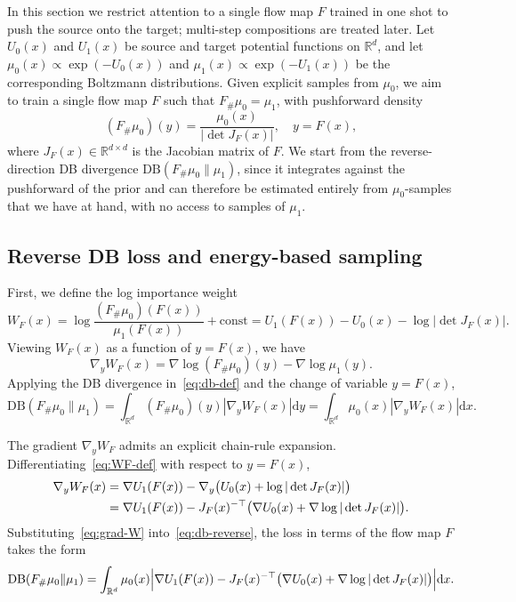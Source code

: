 \documentclass{article}
\newcommand{\D}{\mathrm{d}}
\newcommand{\DB}{\mathrm{DB}}
\theoremstyle{plain}
\begin{document}
In this section we restrict attention to a single flow map $F$ trained in one shot to push the source onto the target; multi-step compositions are treated later. Let $U_0(x)$ and $U_1(x)$ be source and target potential functions on $\mathbb R^d$, and let $\mu_0(x) \propto \exp(-U_0(x))$ and $\mu_1(x) \propto \exp(-U_1(x))$ be the corresponding Boltzmann distributions. Given explicit samples from $\mu_0$, we aim to train a single flow map $F$ such that $F_{\#}\mu_0 = \mu_1$, with pushforward density
\begin{equation}\label{eq:pushforward}
    (F_{\#}\mu_0)(y) = \frac{\mu_0(x)}{|\det J_F(x)|}, \quad y = F(x),
\end{equation}
where $J_F(x) \in \mathbb R^{d\times d}$ is the Jacobian matrix of $F$. We start from the reverse-direction DB divergence $\DB(F_{\#}\mu_0\|\mu_1)$, since it integrates against the pushforward of the prior and can therefore be estimated entirely from $\mu_0$-samples that we have at hand, with no access to samples of $\mu_1$.

\subsection{Reverse DB loss and energy-based sampling}

First, we define the log importance weight
\begin{equation}\label{eq:WF-def}
    W_F(x) = \log \frac{(F_{\#}\mu_0)(F(x))}{\mu_1(F(x))} + \mathrm{const} = U_1(F(x)) - U_0(x) - \log|\det J_F(x)|.
\end{equation}
Viewing $W_F(x)$ as a function of $y = F(x)$, we have
\begin{equation*}
\nabla_y W_F(x) = \nabla \log (F_{\#}\mu_0)(y) - \nabla \log \mu_1(y).
\end{equation*}
Applying the DB divergence in~\eqref{eq:db-def} and the change of variable $y = F(x)$,
\begin{equation}\label{eq:db-reverse}
    \DB(F_{\#}\mu_0 \| \mu_1) = \int_{\mathbb R^d} (F_{\#}\mu_0)(y) |\nabla_y W_F(x)| \D y = \int_{\mathbb R^d} \mu_0(x) |\nabla_y W_F(x)| \D x.
\end{equation}

The gradient $\nabla_y W_F$ admits an explicit chain-rule expansion. Differentiating~\eqref{eq:WF-def} with respect to $y = F(x)$,
\begin{align}\label{eq:grad-W}
    \nabla_y W_F(x) & = \nabla U_1(F(x)) - \nabla_y\bigl(U_0(x) + \log|\det J_F(x)|\bigr) \notag\\
    & = \nabla U_1(F(x)) - J_F(x)^{-\top} \bigl(\nabla U_0(x) + \nabla \log|\det J_F(x)|\bigr).
\end{align}
Substituting~\eqref{eq:grad-W} into~\eqref{eq:db-reverse}, the loss in terms of the flow map $F$ takes the form
\begin{equation}\label{eq:loss-explicit}
    \DB(F_{\#}\mu_0 \| \mu_1) = \int_{\mathbb R^d} \mu_0(x) \Bigl|\nabla U_1(F(x)) - J_F(x)^{-\top} \bigl(\nabla U_0(x) + \nabla \log|\det J_F(x)|\bigr)\Bigr| \D x.
\end{equation}
\end{document}
